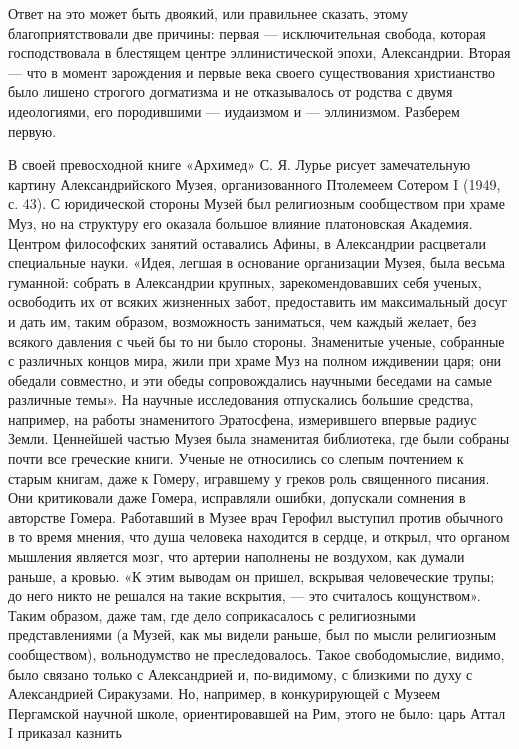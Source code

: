 Ответ на это может быть двоякий, или правильнее сказать, этому
благоприятствовали две причины: первая --- исключительная свобода,
которая господствовала в блестящем центре эллинистической эпохи,
Александрии. Вторая --- что в момент зарождения и первые века своего
существования христианство было лишено строгого догматизма и не
отказывалось от родства с двумя идеологиями, его породившими ---
иудаизмом и --- эллинизмом. Разберем первую.

В своей превосходной книге «Архимед» С. Я. Лурье рисует замечательную
картину Александрийского Музея, организованного Птолемеем Сотером I
(1949, с. 43). С юридической стороны Музей был религиозным сообществом
при храме Муз, но на структуру его оказала большое влияние
платоновская Академия. Центром философских занятий оставались Афины, в
Александрии расцветали специальные науки. «Идея, легшая в основание
организации Музея, была весьма гуманной: собрать в Александрии
крупных, зарекомендовавших себя ученых, освободить их от всяких
жизненных забот, предоставить им максимальный досуг и дать им, таким
образом, возможность заниматься, чем каждый желает, без всякого
давления с чьей бы то ни было стороны. Знаменитые ученые, собранные с
различных концов мира, жили при храме Муз на полном иждивении царя;
они обедали совместно, и эти обеды сопровождались научными беседами на
самые различные темы». На научные исследования отпускались большие
средства, например, на работы знаменитого Эратосфена, измерившего
впервые радиус Земли. Ценнейшей частью Музея была знаменитая
библиотека, где были собраны почти все греческие книги. Ученые не
относились со слепым почтением к старым книгам, даже к Гомеру,
игравшему у греков роль священного писания. Они критиковали даже
Гомера, исправляли ошибки, допускали сомнения в авторстве Гомера.
Работавший в Музее врач Герофил выступил против обычного в то время
мнения, что душа человека находится в сердце, и открыл, что органом
мышления является мозг, что артерии наполнены не воздухом, как думали
раньше, а кровью. «К этим выводам он пришел, вскрывая человеческие
трупы; до него никто не решался на такие вскрытия, --- это считалось
кощунством». Таким образом, даже там, где дело соприкасалось с
религиозными представлениями (а Музей, как мы видели раньше, был по
мысли религиозным сообществом), вольнодумство не преследовалось. Такое
свободомыслие, видимо, было связано только с Александрией и,
по-видимому, с близкими по духу с Александрией Сиракузами. Но,
например, в конкурирующей с Музеем Пергамской научной школе,
ориентировавшей на Рим, этого не было: царь Аттал I приказал казнить
